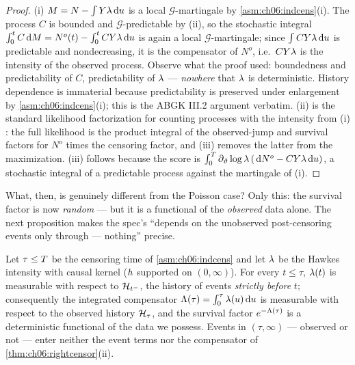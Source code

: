\begin{proof}
(i) $M = N - \int Y\lambda\,\mathrm{d} u$ is a local $\mathcal{G}$-martingale by
\cref{asm:ch06:indcens}(i). The process $C$ is bounded and
$\mathcal{G}$-predictable by (ii), so the stochastic integral
$\int_0^t C \,\mathrm{d} M = N^{o}(t) - \int_0^t CY\lambda \,\mathrm{d} u$ is again a local
$\mathcal{G}$-martingale; since $\int CY\lambda\,\mathrm{d} u$ is predictable and
nondecreasing, it is the compensator of $N^{o}$, i.e.\ $CY\lambda$ is the
intensity of the observed process. Observe what the proof used: boundedness
and predictability of $C$, predictability of $\lambda$ --- \emph{nowhere} that
$\lambda$ is deterministic. History dependence is immaterial because
predictability is preserved under enlargement by
\cref{asm:ch06:indcens}(i); this is the ABGK III.2 argument verbatim.
(ii) is the standard likelihood factorization for counting processes with
the intensity from (i) \citep[II.7, III.2]{abgk1993}: the full likelihood is
the product integral of the observed-jump and survival factors for $N^{o}$
times the censoring factor, and (iii) removes the latter from the
maximization. (iii) follows because the score is
$\int_0^{T} \partial_{\vartheta}\log\lambda \,(\,\mathrm{d} N^{o} -
CY\lambda\,\mathrm{d} u)$, a stochastic integral of a predictable process against
the martingale of (i).
\end{proof}

What, then, is genuinely different from the Poisson case? Only this: the
survival factor is now \emph{random} --- but it is a functional of the
\emph{observed} data alone. The next proposition makes the spec's
``depends on the unobserved post-censoring events only through ---
nothing'' precise.

\begin{proposition}\label{prop:ch06:locality}
Let $\tau \le T$ be the censoring time of \cref{asm:ch06:indcens} and
let $\lambda$ be the Hawkes intensity with causal kernel ($h$ supported
on $(0,\infty)$). For every $t \le \tau$, $\lambda(t)$ is measurable with
respect to $\mathcal{H}_{t^-}$, the history of events \emph{strictly before} $t$;
consequently the integrated compensator
$\Lambda(\tau) = \int_0^{\tau}\lambda(u)\,\mathrm{d} u$ is measurable with respect to the
observed history $\mathcal{H}_{\tau}$, and the survival factor
$e^{-\Lambda(\tau)}$ is a deterministic functional of the data we possess.
Events in $(\tau, \infty)$ --- observed or not --- enter neither the event
terms nor the compensator of \cref{thm:ch06:rightcensor}(ii).
\end{proposition}


